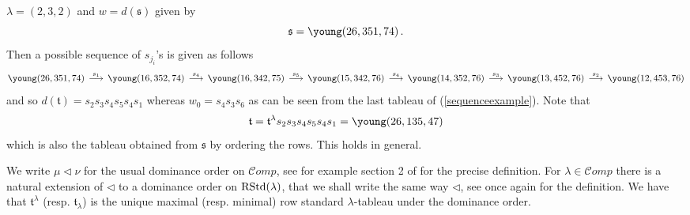 \documentclass[10pt,a4,twoside,hidelinks,rm]{article}
\newcommand{\s}{\mathfrak{s}}
\newcommand{\T}{\mathfrak{t}}
\newcommand{\rstd}{{\rm RStd}}
\theoremstyle{plain}
\begin{document}
$ \lambda = (2,3,2) $ and $ w = d(\s) $ given by 
\begin{equation}
\s= {\young(26,351,74)} \, .
\end{equation}
Then a possible sequence
of $ s_{j_i}$'s is given as follows
\begin{equation}\label{sequenceexample}
 \young(26,351,74) \, \stackrel{s_1} \longrightarrow \,  \young(16,352,74)
 \, \stackrel{s_4} \longrightarrow \,  \young(16,342,75)
 \, \stackrel{s_5} \longrightarrow \,  \young(15,342,76)
 \, \stackrel{s_4} \longrightarrow \,  \young(14,352,76)
 \, \stackrel{s_3} \longrightarrow \,  \young(13,452,76)   
\, \stackrel{s_2} \longrightarrow \,  \young(12,453,76)   
\end{equation}
and so $ d(\T) = s_2 s_3 s_4 s_5 s_4 s_1$
whereas $ w_0  = s_4 s_3 s_6 $ as can be seen from the last tableau of
(\ref{sequenceexample}). 
Note that 
\begin{equation}
\T = \T^{\lambda} s_2 s_3 s_4 s_5 s_4 s_1 =  \young(26,135,47) 
\end{equation}
which is also the tableau obtained from $ \s $ by ordering the rows. This holds in general.

\medskip
{\color{black}
  We write $\mu\lhd \nu$ for the usual dominance order on ${\mathcal Comp}$,
  see for example section 2 of \cite{ER} for
  the precise definition. For $ \lambda \in {\mathcal Comp}$ there is a natural extension of $ \lhd $ to
  a dominance order on 
  $ \rstd(\lambda) $, that we shall write the same way $  \lhd $,
  see once again \cite{ER} for the definition.}
We have that 
$\T^{\lambda} $ (resp. $ \T_{\lambda} $) is the unique maximal (resp. minimal) row standard $\lambda$-tableau
under the dominance order.
\end{document}

